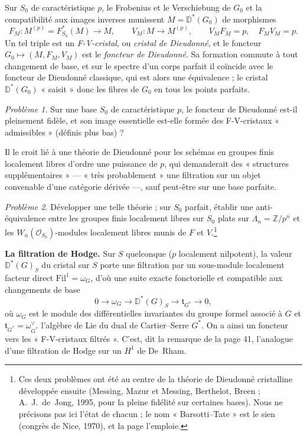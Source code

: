\documentclass[11pt,a4paper]{article}
\begin{document}
Sur $S_0$ de caractéristique $p$, le Frobenius et le Verschiebung de $G_0$ et
la compatibilité aux images inverses munissent $M = \mathbb{D}^*(G_0)$ de
morphismes
\[
  F_M : M^{(p)} = F_{S_0}^*(M) \longrightarrow M, \qquad
  V_M : M \longrightarrow M^{(p)}, \qquad
  V_M F_M = p, \quad F_M V_M = p .
\]
Un tel triple est un \emph{F-V-cristal}, ou \emph{cristal de Dieudonné}, et le
foncteur $G_0 \mapsto (M, F_M, V_M)$ est le \emph{foncteur de Dieudonné}. Sa
formation commute à tout changement de base, et sur le spectre d'un corps
parfait il coïncide avec le foncteur de Dieudonné classique, qui est alors
une équivalence ; le cristal $\mathbb{D}^*(G_0)$ « saisit » donc les fibres
de $G_0$ en tous les points parfaits.

\emph{Problème 1.} Sur une base $S_0$ de caractéristique $p$, le foncteur de
Dieudonné est-il pleinement fidèle, et son image essentielle est-elle formée
des F-V-cristaux « admissibles » (définis plus bas) ?

Il le croit lié à une théorie de Dieudonné pour les schémas en groupes finis
localement libres d'ordre une puissance de $p$, qui demanderait des
« structures supplémentaires » — « très probablement » une filtration sur un
objet convenable d'une catégorie dérivée —, sauf peut-être sur une base
parfaite.

\emph{Problème 2.} Développer une telle théorie ; sur $S_0$ parfait, établir
une anti-équivalence entre les groupes finis localement libres sur $S_0$
plats sur $\Lambda_n = \mathbb{Z}/p^n$ et les $W_n(\mathcal{O}_{S_0})$-modules
localement libres munis de $F$ et $V$.\footnote{Ces deux problèmes ont été au
centre de la théorie de Dieudonné cristalline développée ensuite (Messing,
Mazur et Messing, Berthelot, Breen ; A.~J.~de~Jong, 1995, pour la pleine
fidélité sur certaines bases). Nous ne précisons pas ici l'état de chacun ; le nom
« Barsotti--Tate » est le sien (congrès de Nice, 1970), et la page l'emploie.}

\textbf{La filtration de Hodge.} Sur $S$ quelconque ($p$ localement
nilpotent), la valeur $\mathbb{D}^*(G)_S$ du cristal sur $S$ porte une
filtration par un sous-module localement facteur direct
$\mathrm{Fil}^1 = \omega_G$, d'où une suite exacte fonctorielle et compatible
aux changements de base
\[
  0 \longrightarrow \omega_G \longrightarrow \mathbb{D}^*(G)_S
  \longrightarrow \mathfrak{t}_{G^*} \longrightarrow 0,
\]
où $\omega_G$ est le module des différentielles invariantes du groupe formel
associé à $G$ et $\mathfrak{t}_{G^*} = \omega_{G^*}^{\vee}$ l'algèbre de Lie du
dual de Cartier--Serre $G^*$. On a ainsi un foncteur vers les « F-V-cristaux
filtrés ». C'est, dit la remarque de la page 41, l'analogue d'une filtration
de Hodge sur un $H^1$ de De~Rham.
\end{document}
